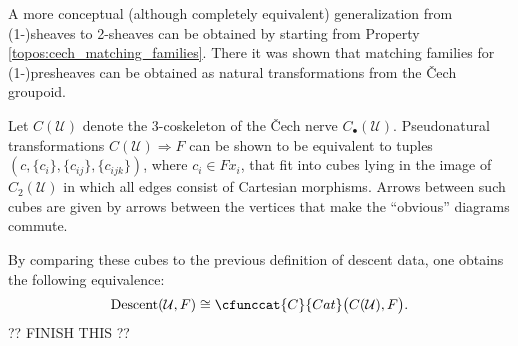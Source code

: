 
    A more conceptual (although completely equivalent) generalization from (1-)sheaves to 2-sheaves can be obtained by starting from Property \ref{topos:cech_matching_families}. There it was shown that matching families for (1-)presheaves can be obtained as natural transformations from the \v{C}ech groupoid.
    \begin{property}
        Let $C(\mathcal{U})$ denote the 3-coskeleton of the \v{C}ech nerve $C_\bullet(\mathcal{U})$. Pseudonatural transformations $C(\mathcal{U})\Rightarrow F$ can be shown to be equivalent to tuples $(c,\{c_i\},\{c_{ij}\},\{c_{ijk}\})$, where $c_i\in Fx_i$, that fit into cubes lying in the image of $C_2(\mathcal{U})$ in which all edges consist of Cartesian morphisms. Arrows between such cubes are given by arrows between the vertices that make the ``obvious'' diagrams commute.

        By comparing these cubes to the previous definition of descent data, one obtains the following equivalence:
        \begin{gather}
            \mathrm{Descent}(\mathcal{U},F)\cong\cfunccat{C}{Cat}\big(C(\mathcal{U}),F\big).
        \end{gather}
        ?? FINISH THIS ??
    \end{property}

